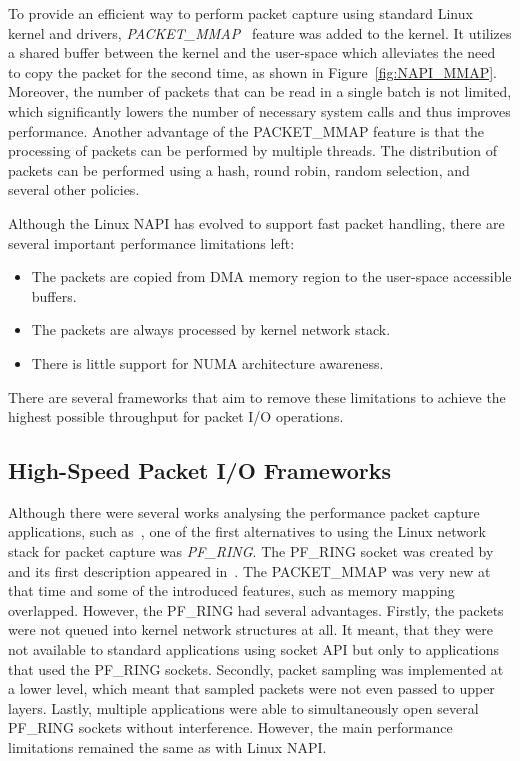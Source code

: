 To provide an efficient way to perform packet capture using standard Linux kernel and drivers, \emph{PACKET\_MMAP}~\cite{LinuxKernelOrganization-2017-PACKETMMAP} feature was added to the kernel. It utilizes a shared buffer between the kernel and the user-space which alleviates the need to copy the packet for the second time, as shown in Figure~\ref{fig:NAPI_MMAP}. Moreover, the number of packets that can be read in a single batch is not limited, which significantly lowers the number of necessary system calls and thus improves performance. Another advantage of the PACKET\_MMAP feature is that the processing of packets can be performed by multiple threads. The distribution of packets can be performed using a hash, round robin, random selection, and several other policies. 

Although the Linux NAPI has evolved to support fast packet handling, there are several important performance limitations left:
\begin{itemize}
  \item The packets are copied from DMA memory region to the user-space accessible buffers.
  \item The packets are always processed by kernel network stack.
  \item There is little support for NUMA architecture awareness.
\end{itemize}

There are several frameworks that aim to remove these limitations to achieve the highest possible throughput for packet I/O operations.


\subsection{High-Speed Packet I/O Frameworks}

Although there were several works analysing the performance packet capture applications, such as~\cite{Degioanni-2003-Profiling}, one of the first alternatives to using the Linux network stack for packet capture was \emph{PF\_RING}. The PF\_RING socket was created by \citeauthor{Deri-2004-Improving} and its first description appeared in~\cite{Deri-2004-Improving}. The PACKET\_MMAP was very new at that time and some of the introduced features, such as memory mapping overlapped. However, the PF\_RING had several advantages. Firstly, the packets were not queued into kernel network structures at all. It meant, that they were not available to standard applications using socket API but only to applications that used the PF\_RING sockets. Secondly, packet sampling was implemented at a lower level, which meant that sampled packets were not even passed to upper layers. Lastly, multiple applications were able to simultaneously open several PF\_RING sockets without interference. However, the main performance limitations remained the same as with Linux NAPI.

